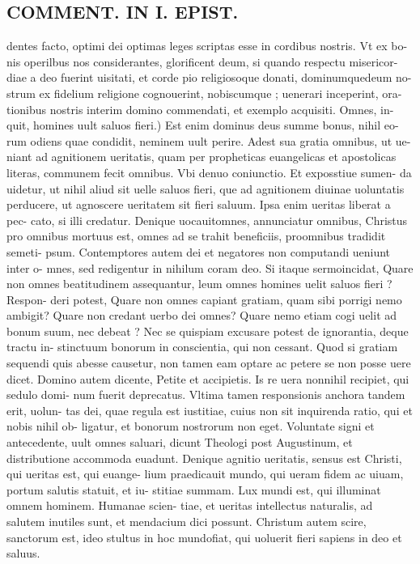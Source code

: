 \documentclass{article}
\begin{document}
\begin{pages}
\section*{COMMENT. IN I. EPIST. }
\marginpar{[ p.482 ]}\pstart dentes facto, optimi dei optimas leges scriptas esse in cordibus nostris. Vt ex bo- nis operilbus nos considerantes, glorificent deum, si quando respectu misericor- diae a deo fuerint uisitati, et corde pio religiosoque  donati, dominumquedeum no- strum ex fidelium religione cognouerint, nobiscumque ; uenerari inceperint, ora- tionibus nostris interim domino commendati, et exemplo acquisiti. Omnes, in- quit, homines uult saluos fieri.) Est enim dominus deus summe bonus, nihil eo- rum odiens quae condidit, neminem uult perire. Adest sua gratia omnibus, ut ue- niant ad agnitionem ueritatis, quam per propheticas euangelicas et apostolicas literas, communem fecit omnibus. Vbi denuo coniunctio. Et exposstiue sumen- da uidetur, ut nihil aliud sit uelle saluos fieri, que  ad agnitionem diuinae uoluntatis perducere, ut agnoscere ueritatem sit fieri saluum. Ipsa enim ueritas liberat a pec- cato, si illi credatur. Denique  uocauitomnes, annunciatur omnibus, Christus pro omnibus mortuus est, omnes ad se trahit beneficiis, proomnibus tradidit semeti- psum. Contemptores autem dei et negatores non computandi ueniunt inter o- mnes, sed redigentur in nihilum coram deo. Si itaque sermoincidat, Quare non omnes beatitudinem assequantur, leum omnes homines uelit saluos fieri ?Respon- deri potest, Quare non omnes capiant gratiam, quam sibi porrigi nemo ambigit? Quare non credant uerbo dei omnes? Quare nemo etiam cogi uelit ad bonum suum, nec debeat ? Nec se quispiam excusare potest de ignorantia, deque  tractu in- stinctuum bonorum in conscientia, qui non cessant. Quod si gratiam sequendi quis abesse causetur, non tamen eam optare ac petere se non posse uere dicet. Domino autem dicente, Petite et accipietis. Is re uera nonnihil recipiet, qui sedulo domi- num fuerit deprecatus. Vltima tamen responsionis anchora tandem erit, uolun- tas dei, quae regula est iustitiae, cuius non sit inquirenda ratio, qui et nobis nihil ob- ligatur, et bonorum nostrorum non eget. Voluntate signi et antecedente, uult omnes saluari, dicunt Theologi post Augustinum, et distributione accommoda euadunt. Denique  agnitio ueritatis, sensus est Christi, qui ueritas est, qui euange- lium praedicauit mundo, qui ueram fidem ac uiuam, portum salutis statuit, et iu- stitiae summam. Lux mundi est, qui illuminat omnem hominem. Humanae scien- tiae, et ueritas intellectus naturalis, ad salutem inutiles sunt, et mendacium dici possunt. Christum autem scire, sanctorum est, ideo stultus in hoc mundofiat, qui uoluerit fieri sapiens in deo et saluus.  \pend
{}
{}

\end{pages}
\end{document}
